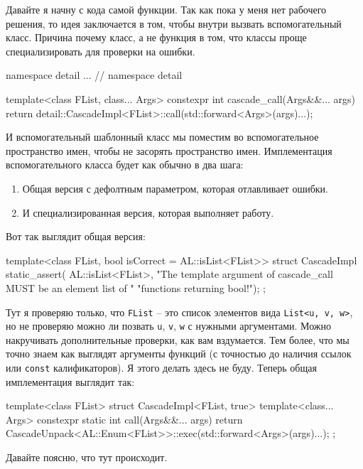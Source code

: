 Давайте я начну с кода самой функции.
Так как пока у меня нет рабочего решения, то идея заключается в том, чтобы внутри вызвать вспомогательный класс.
Причина почему класс, а не функция в том, что классы проще специализировать для проверки на ошибки.
\begin{cppcode}
namespace detail {
  ...
} // namespace detail

template<class FList, class... Args>
constexpr int cascade_call(Args&&... args) {
  return detail::CascadeImpl<FList>::call(std::forward<Args>(args)...);
}
\end{cppcode}
И вспомогательный шаблонный класс мы поместим во вспомогательное пространство имен, чтобы не засорять пространство имен.
Имплементация вспомогательного класса будет как обычно в два шага:
\begin{enumerate}
\item Общая версия с дефолтным параметром, которая отлавливает ошибки.

\item И специализированная версия, которая выполняет работу.
\end{enumerate}
Вот так выглядит общая версия:
\begin{cppcode}
template<class FList, bool isCorrect = AL::isList<FList>>
struct CascadeImpl {
  static_assert(
      AL::isList<FList>,
      "The template argument of cascade_call MUST be an element list of "
      "functions returning bool!");
};
\end{cppcode}
Тут я проверяю только, что \verb"FList" -- это список элементов вида \verb"List<u, v, w>", но не проверяю можно ли позвать \verb"u", \verb"v", \verb"w" с нужными аргументами.
Можно накручивать дополнительные проверки, как вам вздумается.
Тем более, что мы точно знаем как выглядят аргументы функций (с точностью до наличия ссылок или \verb"const" калификаторов).
Я этого делать здесь не буду.
Теперь общая имплементация выглядит так:
\begin{cppcode}
template<class FList>
struct CascadeImpl<FList, true> {
  template<class... Args>
  constexpr static int call(Args&&... args) {
    return CascadeUnpack<AL::Enum<FList>>::exec(std::forward<Args>(args)...);
  }
};
\end{cppcode}
Давайте поясню, что тут происходит.
